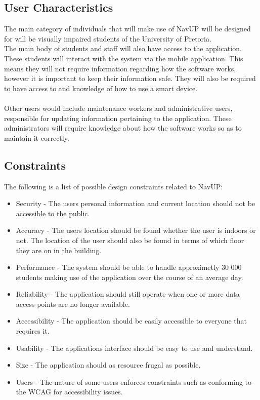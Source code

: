 	\subsection{User Characteristics}
		The main category of individuals that will make use of NavUP will be designed for will be visually impaired students of the University of Pretoria.\\
		The main body of students and staff will also have access to the application.
		These students will interact with the system via the mobile application. This means they will not require information regarding how the software works, however it is important to keep their information safe. They will also be required to have access to and knowledge of how to use a smart device.\\ \\
		Other users would include maintenance workers and administrative users, responsible for updating information pertaining to the application. These administrators will require knowledge about how the software works so as to maintain it correctly.
	
	
	
	\subsection{Constraints}
		The following is a list of possible design constraints related to NavUP:
		
			\begin{itemize}
				\item Security  - The users personal information and current location should not be accessible to the public.
				\item Accuracy - The users location should be found whether the user is indoors or not. The location of the user should also be found in terms of which floor they are on in the building.
				\item Performance - The system should be able to handle approximetly 30 000 students making use of the application over the course of an average day.
				\item Reliability - The application should still operate when one or more data access points are no longer available.
				\item Accessibility - The application should be easily accessible to everyone that requires it.
				\item Usability - The applications interface should be easy to use and understand.
				\item Size - The application should as resource frugal as possible.
				\item Users - The nature of some users enforces constraints such as conforming to the WCAG for accessibility issues.
			\end{itemize}
	
